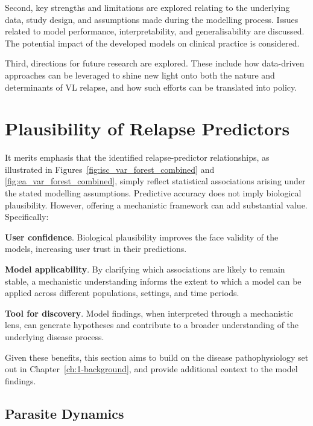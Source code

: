 Second, key strengths and limitations are explored relating to the underlying data, study design, and assumptions made during the modelling process. Issues related to model performance, interpretability, and generalisability are discussed. The potential impact of the developed models on clinical practice is considered.

Third, directions for future research are explored. These include how data-driven approaches can be leveraged to shine new light onto both the nature and determinants of VL relapse, and how such efforts can be translated into policy.

\section{Plausibility of Relapse Predictors}

It merits emphasis that the identified relapse-predictor relationships, as illustrated in Figures~\ref{fig:isc_var_forest_combined} and \ref{fig:ea_var_forest_combined}, simply reflect statistical associations arising under the stated modelling assumptions. Predictive accuracy does not imply biological plausibility. However, offering a mechanistic framework can add substantial value. Specifically:

\begin{description}
  \item{\textbf{User confidence}}. Biological plausibility improves the face validity of the models, increasing user trust in their predictions.
  \item{\textbf{Model applicability}}. By clarifying which associations are likely to remain stable, a mechanistic understanding informs the extent to which a model can be applied across different populations, settings, and time periods.
  \item{\textbf{Tool for discovery}}. Model findings, when interpreted through a mechanistic lens, can generate hypotheses and contribute to a broader understanding of the underlying disease process.
\end{description}

Given these benefits, this section aims to build on the disease pathophysiology set out in Chapter~\ref{ch:1-background}, and provide additional context to the model findings.

\subsection{Parasite Dynamics}

